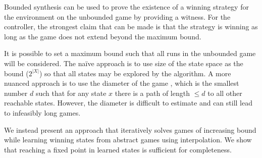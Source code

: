 \documentclass{llncs}
\begin{document}
\label{sect:unbounded}

Bounded synthesis can be used to prove the existence of a winning strategy for
the environment on the unbounded game by providing a witness. For the
controller, the strongest claim that can be made is that the strategy is
winning as long as the game does not extend beyond the maximum bound.

It is possible to set a maximum bound such that all runs in the unbounded game will be
considered. The na\"ive approach is to use size of the state space as the bound
($2^{|X|}$) so that all states may be explored by the algorithm. A more nuanced
approach is to use the diameter of the game \cite{biere1999}, which is the
smallest number $d$ such that for any state $x$ there is a path of length $\leq
d$ to all other reachable states. However, the diameter is difficult to
estimate and can still lead to infeasibly long games.

We instead present an approach that iteratively solves games of increasing
bound while learning winning states from abstract games using interpolation. We
show that reaching a fixed point in learned states is sufficient for
completeness.






\end{document}
